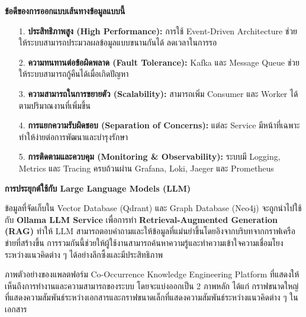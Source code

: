 \documentclass[12pt,a4paper]{article}
\newcommand{\textlight}[1]{{\thailightfont #1}}
\begin{document}
\begin{enumerate}[leftmargin=2cm]
\begin{enumerate}
{            \vspace{0.5cm}

            \textbf{ข้อดีของการออกแบบเส้นทางข้อมูลแบบนี้}

            \begin{enumerate}
                \item[1.] \textbf{ประสิทธิภาพสูง (High Performance):} การใช้ Event-Driven Architecture ช่วยให้ระบบสามารถประมวลผลข้อมูลแบบขนานกันได้ ลดเวลาในการรอ
                \item[2.] \textbf{ความทนทานต่อข้อผิดพลาด (Fault Tolerance):} Kafka และ Message Queue ช่วยให้ระบบสามารถกู้คืนได้เมื่อเกิดปัญหา
                \item[3.] \textbf{ความสามารถในการขยายตัว (Scalability):} สามารถเพิ่ม Consumer และ Worker ได้ตามปริมาณงานที่เพิ่มขึ้น
                \item[4.] \textbf{การแยกความรับผิดชอบ (Separation of Concerns):} แต่ละ Service มีหน้าที่เฉพาะ ทำให้ง่ายต่อการพัฒนาและบำรุงรักษา
                \item[5.] \textbf{การติดตามและควบคุม (Monitoring \& Observability):} ระบบมี Logging, Metrics และ Tracing ครบถ้วนผ่าน Grafana, Loki, Jaeger และ Prometheus
            \end{enumerate}

            \vspace{0.7cm}

            \textbf{การประยุกต์ใช้กับ Large Language Models (LLM)}

            \hspace{1cm}ข้อมูลที่จัดเก็บใน Vector Database (Qdrant) และ Graph Database (Neo4j) จะถูกนำไปใช้กับ \textbf{Ollama LLM Service} เพื่อการทำ \textbf{Retrieval-Augmented Generation (RAG)} ทำให้ LLM สามารถตอบคำถามและให้ข้อมูลที่แม่นยำขึ้นโดยอิงจากบริบทจากกราฟเครือข่ายที่สร้างขึ้น การรวมกันนี้ช่วยให้ผู้ใช้งานสามารถค้นหาความรู้และทำความเข้าใจความเชื่อมโยงระหว่างแนวคิดต่าง ๆ ได้อย่างลึกซึ้งและมีประสิทธิภาพ
        }
    \end{enumerate}

    \vspace{1cm}

    \textlight{
        ภาพตัวอย่างของแพลตฟอร์ม Co-Occurrence Knowledge Engineering Platform ที่แสดงให้เห็นถึงการทำงานและความสามารถของระบบ โดยจะแบ่งออกเป็น 2 ภาพหลัก ได้แก่ กราฟขนาดใหญ่ที่แสดงความสัมพันธ์ระหว่างเอกสารและกราฟขนาดเล็กที่แสดงความสัมพันธ์ระหว่างแนวคิดต่าง ๆ ในเอกสาร
    }


\end{enumerate}
\end{document}
